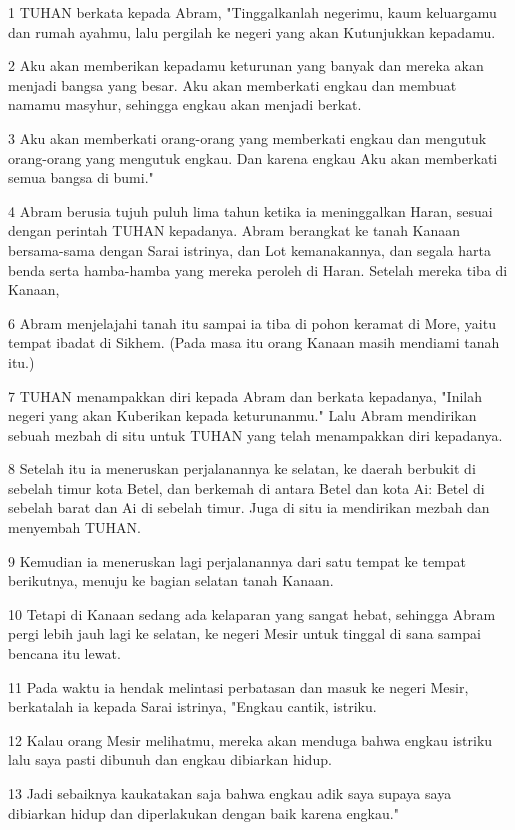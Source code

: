 \par 1 TUHAN berkata kepada Abram, "Tinggalkanlah negerimu, kaum keluargamu dan rumah ayahmu, lalu pergilah ke negeri yang akan Kutunjukkan kepadamu.
\par 2 Aku akan memberikan kepadamu keturunan yang banyak dan mereka akan menjadi bangsa yang besar. Aku akan memberkati engkau dan membuat namamu masyhur, sehingga engkau akan menjadi berkat.
\par 3 Aku akan memberkati orang-orang yang memberkati engkau dan mengutuk orang-orang yang mengutuk engkau. Dan karena engkau Aku akan memberkati semua bangsa di bumi."
\par 4 Abram berusia tujuh puluh lima tahun ketika ia meninggalkan Haran, sesuai dengan perintah TUHAN kepadanya. Abram berangkat ke tanah Kanaan bersama-sama dengan Sarai istrinya, dan Lot kemanakannya, dan segala harta benda serta hamba-hamba yang mereka peroleh di Haran. Setelah mereka tiba di Kanaan,
\par 6 Abram menjelajahi tanah itu sampai ia tiba di pohon keramat di More, yaitu tempat ibadat di Sikhem. (Pada masa itu orang Kanaan masih mendiami tanah itu.)
\par 7 TUHAN menampakkan diri kepada Abram dan berkata kepadanya, "Inilah negeri yang akan Kuberikan kepada keturunanmu." Lalu Abram mendirikan sebuah mezbah di situ untuk TUHAN yang telah menampakkan diri kepadanya.
\par 8 Setelah itu ia meneruskan perjalanannya ke selatan, ke daerah berbukit di sebelah timur kota Betel, dan berkemah di antara Betel dan kota Ai: Betel di sebelah barat dan Ai di sebelah timur. Juga di situ ia mendirikan mezbah dan menyembah TUHAN.
\par 9 Kemudian ia meneruskan lagi perjalanannya dari satu tempat ke tempat berikutnya, menuju ke bagian selatan tanah Kanaan.
\par 10 Tetapi di Kanaan sedang ada kelaparan yang sangat hebat, sehingga Abram pergi lebih jauh lagi ke selatan, ke negeri Mesir untuk tinggal di sana sampai bencana itu lewat.
\par 11 Pada waktu ia hendak melintasi perbatasan dan masuk ke negeri Mesir, berkatalah ia kepada Sarai istrinya, "Engkau cantik, istriku.
\par 12 Kalau orang Mesir melihatmu, mereka akan menduga bahwa engkau istriku lalu saya pasti dibunuh dan engkau dibiarkan hidup.
\par 13 Jadi sebaiknya kaukatakan saja bahwa engkau adik saya supaya saya dibiarkan hidup dan diperlakukan dengan baik karena engkau."
